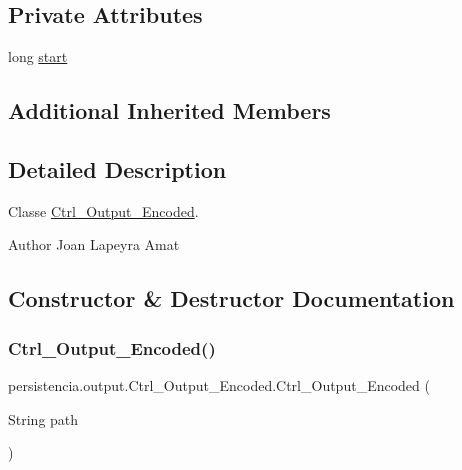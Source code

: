 \subsection*{Private Attributes}
\begin{DoxyCompactItemize}
\item 
long \hyperlink{classpersistencia_1_1output_1_1Ctrl__Output__Encoded_a297adbe95417ad0a03883da607ec6dfe}{start}
\end{DoxyCompactItemize}
\subsection*{Additional Inherited Members}


\subsection{Detailed Description}
Classe \hyperlink{classpersistencia_1_1output_1_1Ctrl__Output__Encoded}{Ctrl\+\_\+\+Output\+\_\+\+Encoded}. 

\begin{DoxyAuthor}{Author}
Joan Lapeyra Amat 
\end{DoxyAuthor}


\subsection{Constructor \& Destructor Documentation}
\mbox{\label{classpersistencia_1_1output_1_1Ctrl__Output__Encoded_adf87a2fd9d945fea928324f09866e889}} 
\subsubsection{\texorpdfstring{Ctrl\+\_\+\+Output\+\_\+\+Encoded()}{Ctrl\_Output\_Encoded()}\hspace{0.1cm}{\footnotesize\ttfamily [1/2]}}
{\footnotesize\ttfamily persistencia.\+output.\+Ctrl\+\_\+\+Output\+\_\+\+Encoded.\+Ctrl\+\_\+\+Output\+\_\+\+Encoded (\begin{DoxyParamCaption}\item[{String}]{path }\end{DoxyParamCaption})\hspace{0.3cm}{\ttfamily [inline]}}



